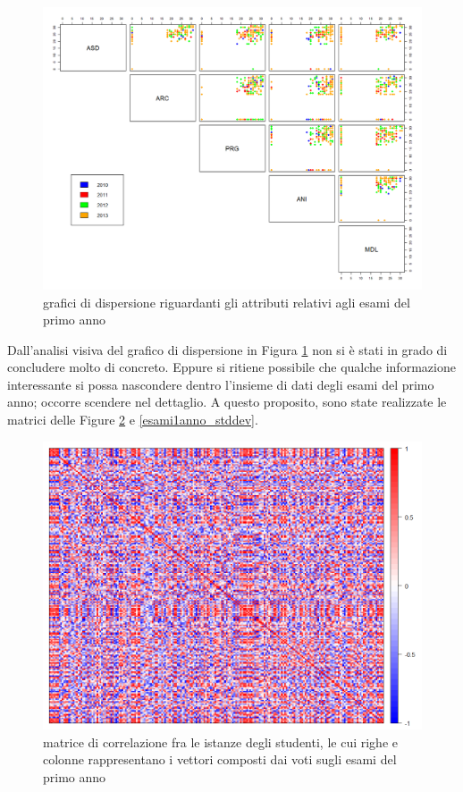                 \begin{figure}
                    \centering
                    \caption{grafici di dispersione riguardanti gli attributi relativi agli esami del primo anno}
                    \label{esami1anno_sp}
                	\includegraphics[scale=0.34]{img/scatter_plot_4_gen.png}
                \end{figure}

                Dall’analisi visiva del grafico di dispersione in Figura \ref{esami1anno_sp} non si è stati in grado di concludere molto di concreto. Eppure si ritiene possibile che qualche informazione interessante si possa nascondere dentro l’insieme di dati degli esami del primo anno; occorre scendere nel dettaglio. A questo proposito, sono state realizzate le matrici delle Figure \ref{esami1anno_corr} e \ref{esami1anno_stddev}. \\

                \begin{figure}
                    \centering
                    \caption{matrice di correlazione fra le istanze degli studenti, le cui righe e colonne rappresentano i vettori composti dai voti sugli esami del primo anno}
                    \label{esami1anno_corr}
                	\includegraphics[scale=0.35]{img/corr_matrix_1.png}
                \end{figure}

